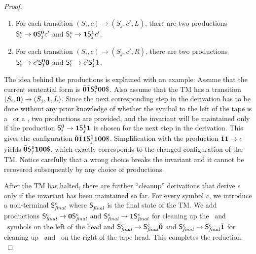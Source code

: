\documentclass[preprint, 9pt]{sigplanconf}
\begin{document}
\begin{proof}
\begin{enumerate}
\item For each transition  $(S_i, c) \rightarrow (S_j,c',L)$, there are
  two  productions $\mathsf{S}_{i}^{c}  \rightarrow  \mathbf{0} \mathsf{S}_{j}^{\mathbf{0}}c'$
  and $\mathsf{S}_{i}^{c} \rightarrow \mathbf{1} \mathsf{S}_{j}^{\mathbf{1}}c'$.
\item For each  transition $(S_i, c) \rightarrow (S_j,c',R)$, there
  are two productions
  $\mathsf{S}_{i}^{c} \rightarrow \overline{c'} \mathsf{S}_{j}^{\mathbf{0}}\bar{\mathbf{0}}$ and $\mathsf{S}_{i}^{c}
  \rightarrow \overline{c'} \mathsf{S}_{j}^{\mathbf{1}}\bar{\mathbf{1}}$. 
\end{enumerate}
The idea  behind the  productions is explained  with an
example:  Assume that  the current  sentential form  is
$\bcar\bcdr\nont{i}{\acar}\acar\acar\$$. Also  assume that  the
TM  has  a   transition  $(S_i,\mathbf{0})  \rightarrow
(S_j,\mathbf{1}, L)$.  Since the next corresponding  step in
the  derivation  has  to  be  done  without  any  prior
knowledge of whether the symbol to the left of the tape
is a \acar\  or a \acdr, two  productions are provided,
and  the  invariant  will  be maintained  only  if  the
production         $\mathsf{S}_{i}^{\mathbf{0}}         \rightarrow
\mathbf{1}\mathsf{S}_{j}^{\mathbf{1}}\mathbf{1}$ is chosen  for the next step
in  the  derivation.    This  gives  the  configuration
$\bcar\bcdr\acdr\nont{j}{\acdr}\acdr\acar\acar\$$.
Simplification   with    the   production   $\bar{\mathbf{1}}\mathbf{1}
\rightarrow               \epsilon$              yields
$\bcar\nont{j}{\acdr}\acdr\acar\acar\$$,    which   exactly
corresponds  to   the  changed  configuration   of  the
TM.  Notice  carefully that a wrong  choice breaks
the invariant  and it cannot be  recovered subsequently
by any choice of productions.

After the  TM has  halted, there  are further  ``cleanup'' derivations
that derive  $\epsilon$ only if  the invariant has been  maintained so
far.    For   every   symbol   $c$,  we   introduce   a   non-terminal
$\mathsf{S}_{\mathit{final}}^{c}$  where   $\mathsf{S}_{\mathit{final}}^{}$  is  the
final state  of the  TM. We add  productions $\mathsf{S}_{\mathit{final}}^{c}
\rightarrow         \mathbf{0}        \mathsf{S}_{\mathit{final}}^{c}$         and
$\mathsf{S}_{\mathit{final}}^{c} \rightarrow  \mathbf{1} \mathsf{S}_{\mathit{final}}^{c}$
for cleaning up the \bcar\ and \bcdr\  symbols on the left of the head
and                $\mathsf{S}_{\mathit{final}}^{c}               \rightarrow
\mathsf{S}_{\mathit{final}}^{c}\bar{\mathbf{0}}$      and      $\mathsf{S}_{\mathit{final}}^{c}
\rightarrow \mathsf{S}_{\mathit{final}}^{c}\bar{\mathbf{1}}$ for  cleaning up \acar\ and
\acdr\ on the right of the tape head.  This completes the
reduction.\\ \mbox{}
\end{proof}
\end{document}
